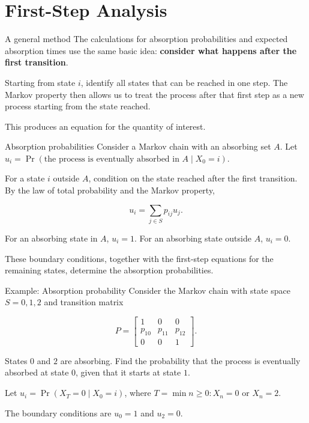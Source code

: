 \documentclass[
  ignorenonframetext,
  aspectratio=169,
]{beamer}
\begin{document}
\section{First-Step Analysis}\label{first-step-analysis}

\begin{frame}{A general method}
\protect{}\label{a-general-method}
The calculations for absorption probabilities and expected absorption
times use the same basic idea: \textbf{consider what happens after the
first transition}.

Starting from state \(i\), identify all states that can be reached in
one step. The Markov property then allows us to treat the process after
that first step as a new process starting from the state reached.

This produces an equation for the quantity of interest.
\end{frame}

\begin{frame}{Absorption probabilities}
\protect{}\label{absorption-probabilities-2}
Consider a Markov chain with an absorbing set \(A\). Let
\(u_i=\Pr(\text{the process is eventually absorbed in }A\mid X_0=i)\).

For a state \(i\) outside \(A\), condition on the state reached after
the first transition. By the law of total probability and the Markov
property,

\[
u_i=\sum_{j\in S}p_{ij}u_j.
\]

For an absorbing state in \(A\), \(u_i=1\). For an absorbing state
outside \(A\), \(u_i=0\).

These boundary conditions, together with the first-step equations for
the remaining states, determine the absorption probabilities.
\end{frame}

\begin{frame}{Example: Absorption probability}
\protect{}\label{example-absorption-probability}
Consider the Markov chain with state space \(S={0,1,2}\) and transition
matrix

\[
P=
\begin{bmatrix}
1&0&0\\
p_{10}&p_{11}&p_{12}\\
0&0&1
\end{bmatrix}.
\]

States \(0\) and \(2\) are absorbing. Find the probability that the
process is eventually absorbed at state \(0\), given that it starts at
state \(1\).

Let \(u_i=\Pr(X_T=0\mid X_0=i)\), where
\(T=\min{n\geq0:X_n=0\text{ or }X_n=2}\).

The boundary conditions are \(u_0=1\) and \(u_2=0\).
\end{frame}
\end{document}
